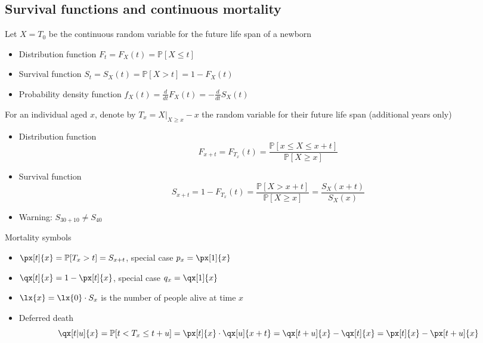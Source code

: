 \subsection{Survival functions and continuous mortality}

Let $X = T_0$ be the continuous random variable for the future life span of a newborn
\begin{itemize}
\item Distribution function $F_t = F_X(t) = \mathbb{P}[X\leq t]$
\item Survival function $S_t = S_X(t) = \mathbb{P}[X > t] = 1 - F_X(t)$
\item Probability density function $f_X(t) = \frac{d}{dt}F_X(t) = -\frac{d}{dt}S_X(t)$
\end{itemize}
For an individual aged $x$, denote by $T_x = X\vert_{X\geq x} - x$ the random variable for their future life span (additional years only)
\begin{itemize}
\item Distribution function
\begin{equation*}
F_{x + t} = F_{T_x}(t) = \frac{\mathbb{P}[x\leq X\leq x + t]}{\mathbb{P}[X\geq x]}
\end{equation*}
\item Survival function
\begin{equation*}
S_{x + t} = 1 - F_{T_x}(t) = \frac{\mathbb{P}[X > x + t]}{\mathbb{P}[X\geq x]} = \frac{S_X(x + t)}{S_X(x)}
\end{equation*}
\item Warning: $S_{30 + 10}\neq S_{40}$
\end{itemize}

Mortality symbols
\begin{itemize}
\item $\px[t]{x} = \mathbb{P}[T_x > t] = S_{x + t}$, special case $p_x = \px[1]{x}$
\item $\qx[t]{x} = 1 - \px[t]{x}$, special case $q_x = \qx[1]{x}$
\item $\lx{x} = \lx{0}\cdot S_x$ is the number of people alive at time $x$
\item Deferred death
\begin{equation*}
\qx[t|u]{x} = \mathbb{P}[t < T_x\leq t + u] = \px[t]{x}\cdot\qx[u]{x + t} = \qx[t + u]{x} - \qx[t]{x} = \px[t]{x} - \px[t + u]{x}
\end{equation*}
\end{itemize}

